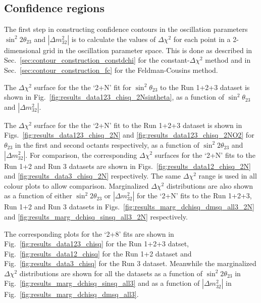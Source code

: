 
\clearpage

\subsection {Confidence regions}
\label{sec:results_contours}

The first step in constructing confidence contours in the oscillation parameters $\sin^{2}2\theta_{23}$ 
and $|\Delta m^{2}_{32}|$ is to calculate 
the values of $\Delta\chi^2$ for each point in a 2-dimensional grid in the oscillation parameter 
space. This is done as described in Sec.\ \ref{sec:contour_construction_constdchi} for the 
constant-$\Delta\chi^2$ method and in Sec.\ \ref{sec:contour_construction_fc} for the Feldman-Cousins method. 

The $\Delta\chi^2$ surface for the the `2+N' fit for $\sin^2\theta_{23}$ to the Run 1+2+3 dataset is shown in Fig.\
\ref{fig:results_data123_chisq_2Nsintheta}, 
as a function of $\sin^{2}\theta_{23}$ and $|\Delta m^{2}_{32}|$.

The $\Delta\chi^2$ surface for the the `2+N' fit
to the Run 1+2+3 dataset is shown in Figs.\
\ref{fig:results_data123_chisq_2N} and \ref{fig:results_data123_chisq_2NO2}
for $\theta_{23}$ in the first and second octants respectively,
as a function of $\sin^{2}2\theta_{23}$ and $|\Delta m^{2}_{32}|$.
For comparison, the corresponding $\Delta\chi^2$ surfaces for the `2+N' fits to the Run 1+2 and Run 3 
datasets are shown in 
Figs.\ \ref{fig:results_data12_chisq_2N} and \ref{fig:results_data3_chisq_2N} respectively.
The same $\Delta\chi^2$ range is used in all colour plots to allow comparison.
Marginalized $\Delta\chi^2$ distributions are also shown as a function of either $\sin^{2}2\theta_{23}$ 
or $|\Delta m^{2}_{32}|$ for the `2+N' fits to the Run 1+2+3, Run 1+2 and Run 3 datasets in Figs.\ 
\ref{fig:results_marg_dchisq_dmsq_all3_2N} and \ref{fig:results_marg_dchisq_sinsq_all3_2N}
respectively.

The corresponding plots for the `2+8' fits are shown in Fig.\ \ref{fig:results_data123_chisq} for the 
Run 1+2+3 datset, Fig.\ \ref{fig:results_data12_chisq} for the Run 1+2 dataset and Fig.\ 
\ref{fig:results_data3_chisq} for the Run 3 dataset. Meanwhile the marginalized $\Delta\chi^2$ distributions are 
shown for all the datasets as a function of $\sin^{2}2\theta_{23}$ in Fig.\ \ref{fig:results_marg_dchisq_sinsq_all3} 
and as a function of $|\Delta m^{2}_{32}|$ in Fig.\ \ref{fig:results_marg_dchisq_dmsq_all3}.

